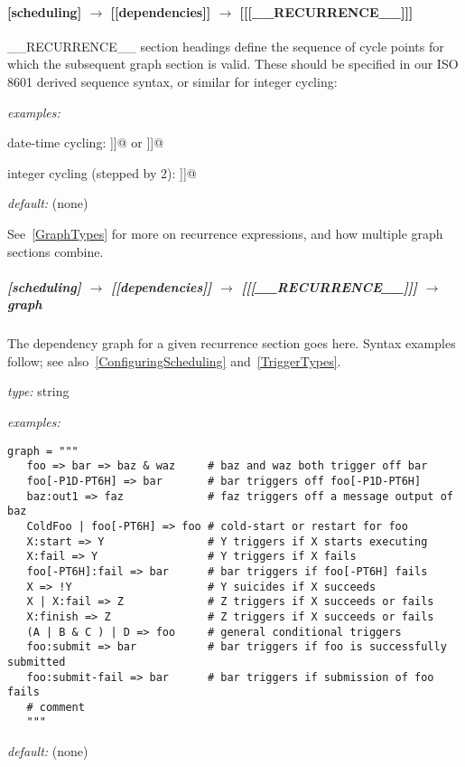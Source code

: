 \paragraph[{[[[}\_\_RECURRENCE\_\_{]]]}]{[scheduling] $\rightarrow$ [[dependencies]] $\rightarrow$ [[[\_\_RECURRENCE\_\_]]]}

\_\_RECURRENCE\_\_ section headings define the sequence of cycle points for
which the subsequent graph section is valid. These should be specified in
our ISO 8601 derived sequence syntax, or similar for integer cycling:
\begin{myitemize}
    \item {\em examples:}
        \begin{myitemize}
            \item date-time cycling:
                \lstinline@[[[T00,T06,T12,T18]]]@ or \lstinline@[[[PT6H]]]@
            \item integer cycling (stepped by 2):
                \lstinline@[[[P2]]]@
        \end{myitemize}
    \item {\em default:} (none)
\end{myitemize}

See~\ref{GraphTypes} for more on recurrence expressions, and how multiple graph
sections combine.

\subparagraph[graph]{[scheduling] $\rightarrow$ [[dependencies]] $\rightarrow$ [[[\_\_RECURRENCE\_\_]]] $\rightarrow$ graph }
\label{GraphDescrip}

The dependency graph for a given recurrence section goes here. Syntax examples
follow; see also~\ref{ConfiguringScheduling} and~\ref{TriggerTypes}.

\begin{myitemize}
\item {\em type:} string
\item {\em examples:}
  \begin{lstlisting}
graph = """
   foo => bar => baz & waz     # baz and waz both trigger off bar
   foo[-P1D-PT6H] => bar       # bar triggers off foo[-P1D-PT6H]
   baz:out1 => faz             # faz triggers off a message output of baz
   ColdFoo | foo[-PT6H] => foo # cold-start or restart for foo
   X:start => Y                # Y triggers if X starts executing
   X:fail => Y                 # Y triggers if X fails
   foo[-PT6H]:fail => bar      # bar triggers if foo[-PT6H] fails
   X => !Y                     # Y suicides if X succeeds
   X | X:fail => Z             # Z triggers if X succeeds or fails
   X:finish => Z               # Z triggers if X succeeds or fails
   (A | B & C ) | D => foo     # general conditional triggers
   foo:submit => bar           # bar triggers if foo is successfully submitted
   foo:submit-fail => bar      # bar triggers if submission of foo fails
   # comment
   """
  \end{lstlisting}
\item {\em default:} (none)
\end{myitemize}

